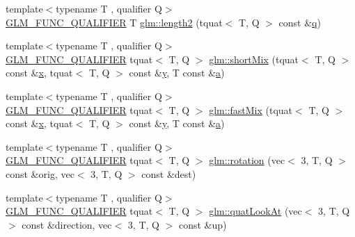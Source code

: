 \begin{DoxyCompactItemize}
\item 
{\footnotesize template$<$typename T , qualifier Q$>$ }\\\hyperlink{setup_8hpp_a33fdea6f91c5f834105f7415e2a64407}{G\+L\+M\+\_\+\+F\+U\+N\+C\+\_\+\+Q\+U\+A\+L\+I\+F\+I\+ER} T \hyperlink{group__gtx__quaternion_ga229bacc3051770b030042fe266f7b0cb}{glm\+::length2} (tquat$<$ T, Q $>$ const \&\hyperlink{_s_d_l__opengl_8h_a8fc1e7b9baaae687804c7eed46ca09c6}{q})
\item 
{\footnotesize template$<$typename T , qualifier Q$>$ }\\\hyperlink{setup_8hpp_a33fdea6f91c5f834105f7415e2a64407}{G\+L\+M\+\_\+\+F\+U\+N\+C\+\_\+\+Q\+U\+A\+L\+I\+F\+I\+ER} tquat$<$ T, Q $>$ \hyperlink{group__gtx__quaternion_gaf0ad63ac791b1f9a587e363837c2d538}{glm\+::short\+Mix} (tquat$<$ T, Q $>$ const \&\hyperlink{_s_d_l__opengl_8h_ad0e63d0edcdbd3d79554076bf309fd47}{x}, tquat$<$ T, Q $>$ const \&\hyperlink{_s_d_l__opengl_8h_a1675d9d7bb68e1657ff028643b4037e3}{y}, T const \&\hyperlink{_s_d_l__opengl__glext_8h_a3309789fc188587d666cda5ece79cf82}{a})
\item 
{\footnotesize template$<$typename T , qualifier Q$>$ }\\\hyperlink{setup_8hpp_a33fdea6f91c5f834105f7415e2a64407}{G\+L\+M\+\_\+\+F\+U\+N\+C\+\_\+\+Q\+U\+A\+L\+I\+F\+I\+ER} tquat$<$ T, Q $>$ \hyperlink{group__gtx__quaternion_gac5c77bc74dfc750aaf271d68f271bf2b}{glm\+::fast\+Mix} (tquat$<$ T, Q $>$ const \&\hyperlink{_s_d_l__opengl_8h_ad0e63d0edcdbd3d79554076bf309fd47}{x}, tquat$<$ T, Q $>$ const \&\hyperlink{_s_d_l__opengl_8h_a1675d9d7bb68e1657ff028643b4037e3}{y}, T const \&\hyperlink{_s_d_l__opengl__glext_8h_a3309789fc188587d666cda5ece79cf82}{a})
\item 
{\footnotesize template$<$typename T , qualifier Q$>$ }\\\hyperlink{setup_8hpp_a33fdea6f91c5f834105f7415e2a64407}{G\+L\+M\+\_\+\+F\+U\+N\+C\+\_\+\+Q\+U\+A\+L\+I\+F\+I\+ER} tquat$<$ T, Q $>$ \hyperlink{group__gtx__quaternion_ga5a729f33cbd904c9ca14cdf25d0a07e4}{glm\+::rotation} (vec$<$ 3, T, Q $>$ const \&orig, vec$<$ 3, T, Q $>$ const \&dest)
\item 
{\footnotesize template$<$typename T , qualifier Q$>$ }\\\hyperlink{setup_8hpp_a33fdea6f91c5f834105f7415e2a64407}{G\+L\+M\+\_\+\+F\+U\+N\+C\+\_\+\+Q\+U\+A\+L\+I\+F\+I\+ER} tquat$<$ T, Q $>$ \hyperlink{group__gtx__quaternion_ga668d9ec9964ced2b455d416677e1e8b9}{glm\+::quat\+Look\+At} (vec$<$ 3, T, Q $>$ const \&direction, vec$<$ 3, T, Q $>$ const \&up)
\item 

\end{DoxyCompactItemize}
